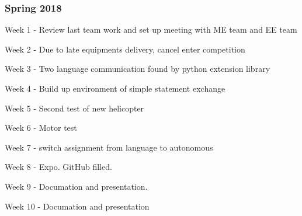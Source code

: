 \documentclass[onecolumn, draftclsnofoot,10pt, compsoc]{IEEEtran}
\begin{document}
\subsubsection{Spring 2018}
		\begin{description}
			\item{Week 1} - Review last team work and set up meeting with ME team and EE team
			\item{Week 2} - Due to late equipments delivery, cancel enter competition 
			\item{Week 3} - Two language communication found by python extension library 			
            \item{Week 4} - Build up environment of simple statement exchange 
			\item{Week 5} - Second test of new helicopter
			\item{Week 6} - Motor test
            \item{Week 7} - switch assignment from language to autonomous
			\item{Week 8} - Expo. GitHub filled.
			\item{Week 9} - Documation and presentation.
            \item{Week 10} - Documation and presentation
		\end{description}
        
\newpage
\end{document}
